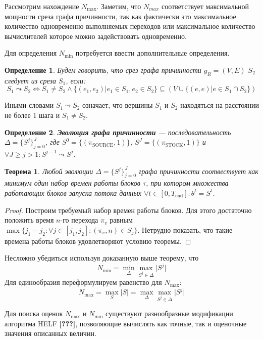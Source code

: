 \documentclass[10pt,a4paper]{article}
\newtheorem{defen}{Определение}
\newtheorem{theorem}{Теорема}
\newcommand{\stock}{\text{STOCK}}
\newcommand{\source}{\text{SOURCE}}
\begin{document}
  Рассмотрим нахождение $N_{\max}$. Заметим, что $N_{max}$ соответствует максимальной мощности среза графа причинности, так как фактически это максимальное
  количество одновременно выполняемых переходов или максимальное количество вычислителей которое можно задействовать одновременно.
  
  Для определения $N_{\min}$ потребуется ввести дополнительные определения.
  \begin{defen}
    Будем говорить, что срез графа причинности $g_R = (V, E)$ $S_2$ следует из среза $S_1$, если:
    $$S_1 \leadsto S_2 \Leftrightarrow S_1 \neq S_2 \wedge \{(e_1, e_2) \vert e_1 \in S_1, e_2 \in S_2\} \subseteq (V \cup \{(e, e) \vert e \in S_1 \cap S_2\})$$
  \end{defen}
  Иными словами $S_1 \leadsto S_2$ означает, что вершины $S_1$ и $S_2$ находяться на расстоянии не более 1 шага и $S_1 \neq S_2$.
  
  \begin{defen}
    \textbf{Эволюция графа причинности} --- последовательность $\Delta = \{S^j\}^{J}_{j = 0}$, где $S^0 = \{(\pi_{\source}, 1)\}$,
    $S^J = \{(\pi_{\stock}, 1)\}$ и $\forall J \geq j > 1: S^{j - 1} \leadsto S^j$.
  \end{defen}
  
  \begin{theorem}
    Любой эволюции $\Delta = \{S^j\}^J_{j = 0}$ графа причинности соотвествует как минимум один набор времен работы блоков $\tau$, при котором
    множества работающих блоков запуска потока данных $\forall t \in [0, T_{\text{end}}]: \theta^t = S^t$.
  \end{theorem}
  \begin{proof}
    Построим требуемый набор времен работы блоков. Для этого достаточно положить время $n$-го перехода $\pi_v$ равным
    $\max \{j_1 - j_2: \forall j \in [j_1, j_2]: (\pi_v, n) \in S_j\}$. Нетрудно показать, что такие времена работы блоков удовлетворяют условию теоремы.
  \end{proof}
  
  Несложно убедиться используя доказанную выше теорему, что $$N_{\min} = \min_{\Delta} \max_{S^j \in \Delta} \lvert S^j \rvert$$
  Для единообразия переформулируем равенство для $N_{\max}$:
  $$N_{\max} = \max_{S} \lvert S \rvert = \max_{\Delta} \max_{S^j \in \Delta} \lvert S^j \rvert$$
  
  Для поиска оценок $N_{\max}$ и $N_{\min}$ существуют разнообразные модификации алгоритма HELF \textbf{[???]},
  позволяющие вычислять как точные, так и оценочные значения описанных величин.
  
\end{document}

